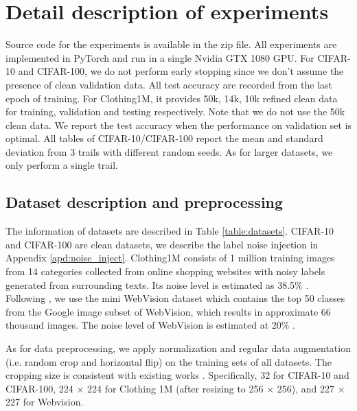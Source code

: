 \documentclass{article}
\begin{document}
\section{Detail description of experiments}
\label{sec:details_of_exp}
Source code for the experiments is available in the zip file. All experiments are implemented in PyTorch and run in a single Nvidia GTX 1080 GPU. For CIFAR-10 and CIFAR-100, we do not perform early stopping since we don't assume the presence of clean validation data. All test accuracy are recorded from the last epoch of training. For Clothing1M, it provides 50k, 14k, 10k refined clean data for training, validation and testing respectively. Note that we do not use the 50k clean data. We report the test accuracy when the performance on validation set is optimal. All tables of CIFAR-10/CIFAR-100 report the mean and standard deviation from 3 trails with different random seeds. As for larger datasets, we only perform a single trail.

\subsection{Dataset description and preprocessing}
\label{sec:preprocess}
The information of datasets are described in Table \ref{table:datasets}. CIFAR-10 and CIFAR-100 are clean datasets, we describe the label noise injection in Appendix \ref{apd:noise_inject}. Clothing1M consists of 1 million training images from 14 categories collected from online shopping websites with noisy labels generated from surrounding texts. Its noise level is estimated as 38.5\% \cite{song2019prestopping}. Following \cite{jiang2017mentornet,chen2019understanding}, we use the mini WebVision dataset which contains the top 50 classes from the Google image subset of WebVision, which results in approximate 66 thousand images. The noise level of WebVision is estimated at 20\% \cite{li2017webvision}.


As for data preprocessing, we apply normalization and regular data augmentation (i.e. random crop and horizontal flip) on the training sets of all datasets. The cropping size is consistent with existing works \cite{liu2020early,li2020dividemix}. Specifically, 32 for CIFAR-10 and CIFAR-100, 224 $\times$ 224 for Clothing 1M (after resizing to 256 $\times$ 256), and 227 $\times$ 227 for Webvision. 
\end{document}

